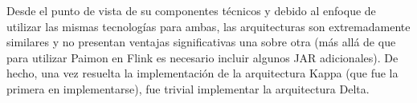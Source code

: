 Desde el punto de vista de su componentes técnicos y debido al enfoque de utilizar las mismas tecnologías para ambas, 
las arquitecturas son extremadamente similares y no presentan ventajas significativas una sobre otra 
(más allá de que para utilizar Paimon en Flink es necesario incluir algunos JAR adicionales).
De hecho, una vez resuelta la implementación de la arquitectura Kappa (que fue la primera en implementarse), fue trivial implementar la arquitectura Delta. 

\newpage